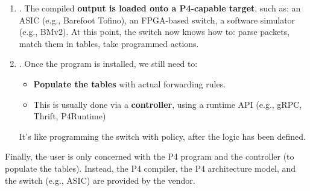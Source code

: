 \begin{enumerate}
    \item {}. The compiled \textbf{output is loaded onto a P4-capable target}, such as: an ASIC (e.g., Barefoot Tofino), an FPGA-based switch, a software simulator (e.g., BMv2). At this point, the switch now knows how to: parse packets, match them in tables, take programmed actions.
    

    \item {}. Once the program is installed, we still need to:
    \begin{itemize}
        \item \textbf{Populate the tables} with actual forwarding rules.
        \item This is usually done via a \textbf{controller}, using a runtime API (e.g., gRPC, Thrift, P4Runtime)
    \end{itemize}
    It's like programming the switch with policy, after the logic has been defined.
\end{enumerate}
Finally, the user is only concerned with the P4 program and the controller (to populate the tables). Instead, the P4 compiler, the P4 architecture model, and the switch (e.g., ASIC) are provided by the vendor.

